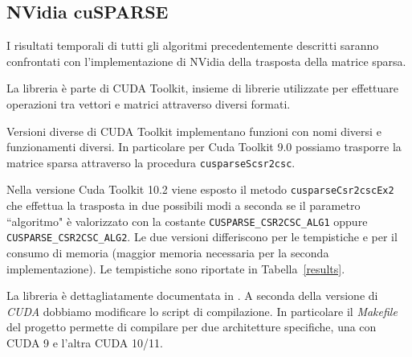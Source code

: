 \subsection{NVidia cuSPARSE}

I risultati temporali di tutti gli algoritmi precedentemente descritti saranno confrontati con l'implementazione di NVidia della trasposta della matrice sparsa. 

La libreria \cuSPARSE{} è parte di \textrm{CUDA Toolkit}, insieme di librerie utilizzate per effettuare operazioni tra vettori e matrici attraverso diversi formati. 

Versioni diverse di \textrm{CUDA Toolkit} implementano funzioni con nomi diversi e funzionamenti diversi. In particolare per \textrm{Cuda Toolkit 9.0} possiamo trasporre la matrice sparsa attraverso la procedura \texttt{cusparseScsr2csc}.

Nella versione \textrm{Cuda Toolkit 10.2} viene esposto il metodo \texttt{cusparseCsr2cscEx2} che effettua la trasposta in due possibili modi a seconda se il parametro ``algoritmo" è valorizzato con la costante \texttt{CUSPARSE\_CSR2CSC\_ALG1} oppure \texttt{CUSPARSE\_CSR2CSC\_ALG2}. Le due versioni differiscono per le tempistiche e per il consumo di memoria (maggior memoria necessaria per la seconda implementazione). Le tempistiche sono riportate in Tabella~\ref{results}.

La libreria è dettagliatamente documentata in \cite{cusparse}. A seconda della versione di \emph{CUDA} dobbiamo modificare lo script di compilazione. In particolare il \emph{Makefile} del progetto permette di compilare per due architetture specifiche, una con CUDA 9 e l'altra CUDA 10/11. 